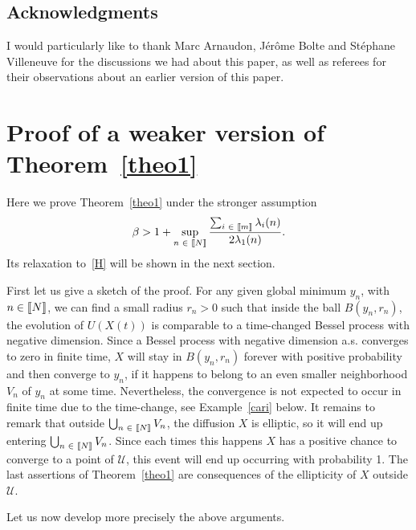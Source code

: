 \documentclass[AHL,Unicode,longabstracts,published]{cedram}
\newcommand{\f}[2]{\frac{#1}{#2}}
\newcommand{\cU}{\mathcal{U}}
\let\oldin\in
\renewcommand{\in}{\mathchoice{\oldin}{\oldin}{\,\oldin\,}{\,\oldin\,}}
\newcommand{\llbracket}{\mathopen{[\mkern -2.7mu[}}
\newcommand{\rrbracket}{\mathclose{]\mkern -2.7mu]}}
\newcommand{\lin}{\llbracket}
\newcommand{\rin}{\rrbracket}
\begin{document}


\subsection*{Acknowledgments}

I would particularly like to thank Marc Arnaudon, Jérôme Bolte and Stéphane Villeneuve for the discussions we had about this paper, as well as referees for their observations about an earlier version of this paper.

\section{Proof of a weaker version of Theorem~\ref{theo1}}\label{proof}

Here we prove Theorem~\ref{theo1} under the stronger assumption
\begin{equation}\label{H3}
\beta >1+\sup_{n\in\lin N\rin}\f{\sum_{i\in\lin m\rin}\lambda_i(n)}{2\lambda_1(n)}.
\end{equation}
Its relaxation to~\eqref{H} will be shown in the next section.

 First let us give a sketch of the proof. For any given global minimum $y_n$, with $n\in\lin N\rin$, we can find a small radius $r_n>0$ such that inside the ball $B(y_n,r_n)$, the evolution of $U(X(t))$ is comparable to a time-changed Bessel process with negative dimension. Since a Bessel process with negative dimension a.s. converges to zero in finite time, $X$ will stay in $B(y_n,r_n)$ forever with positive probability and then converge to $y_n$, if it happens to belong to an even smaller neighborhood $V_n$ of $y_n$ at some time. Nevertheless, the convergence is not expected to occur in finite time due to the time-change, see Example~\ref{cari} below. It remains to remark that outside $\bigcup_{n\in\lin N\rin} V_n$, the diffusion $X$ is elliptic, so it will end up entering $\bigcup_{n\in\lin N\rin} V_n$. Since each times this happens $X$ has a positive chance to converge to a point of $\cU$, this event will end up occurring with probability 1. The last assertions of Theorem~\ref{theo1} are consequences of the ellipticity of $X$ outside $\cU$.


Let us now develop more precisely the above arguments.
\end{document}
